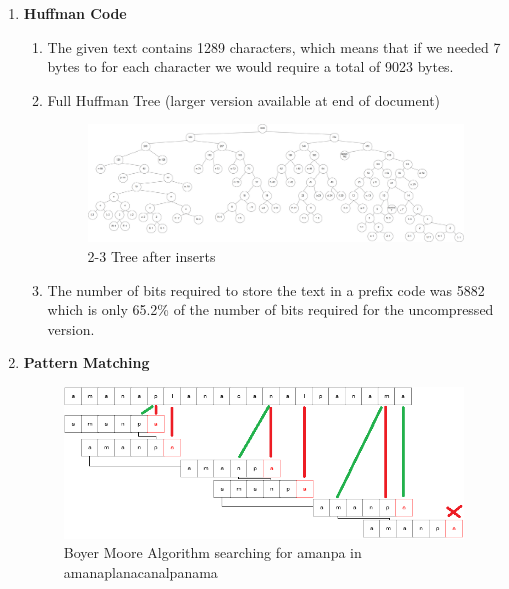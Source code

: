 \documentclass{article}
\begin{document}
\begin{enumerate}
  \item \textbf{Huffman Code}
  \begin{enumerate}
  	\item The given text contains 1289 characters, which means that if we needed 7 bytes to for each character we would require a total of 9023 bytes. 
  	\item 
  	
  	Full Huffman Tree (larger version available at end of document)
  	\begin{figure}[H]
 	  \centering
 	  \caption{2-3 Tree after inserts}
 	  \label{Trees:2-3Tree}
	  \includegraphics[width=\textwidth]{Huffman}
    \end{figure}
  	\item The number of bits required to store the text in a prefix code was 5882 which is only 65.2\% of the number of bits required for the uncompressed version. 
  
  \end{enumerate}
  
  
  \item \textbf{Pattern Matching}
    \begin{figure}[H]
 	  \centering
 	  \caption{Boyer Moore Algorithm searching for  amanpa in amanaplanacanalpanama}
 	  \label{Trees:BoyerMoore}
	  \includegraphics[width=\textwidth]{BoyerMoore}
    \end{figure}
 

\end{enumerate}
\end{document}
